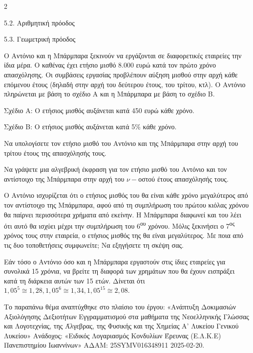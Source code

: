 \begin{ylh}{2}
    \item 5.2. Αριθμητική πρόοδος
    \item 5.3. Γεωμετρική πρόοδος
\end{ylh}
Ο Αντόνιο και η Μπάρμπαρα ξεκινούν να εργάζονται σε διαφορετικές εταιρείες την ίδια μέρα. Ο καθένας έχει ετήσιο μισθό 8.000 ευρώ κατά τον πρώτο χρόνο απασχόλησης. Οι συμβάσεις εργασίας προβλέπουν αύξηση μισθού στην αρχή κάθε επόμενου έτους (δηλαδή στην αρχή του δεύτερου έτους, του τρίτου, κτλ). Ο Αντόνιο πληρώνεται με βάση το σχέδιο Α και η Μπάρμπαρα με βάση το σχέδιο Β.

Σχέδιο Α: Ο ετήσιος μισθός αυξάνεται κατά 450 ευρώ κάθε χρόνο.

Σχέδιο Β: Ο ετήσιος μισθός αυξάνεται κατά 5\% κάθε χρόνο.

\begin{alist}
\item Να υπολογίσετε τον ετήσιο μισθό του Αντόνιο και της Μπάρμπαρα στην αρχή του τρίτου έτους της απασχόλησής τους.
\item Να γράψετε μια αλγεβρική έκφραση για τον ετήσιο μισθό του Αντόνιο και τον αντίστοιχο της Μπάρμπαρα στην αρχή του $\nu -$οστού έτους απασχόλησής τους.
\item Ο Αντόνιο ισχυρίζεται ότι ο ετήσιος μισθός του θα είναι κάθε χρόνο μεγαλύτερος από τον αντίστοιχο της Μπάρμπαρα, αφού από τη συμπλήρωση του πρώτου κιόλας χρόνου θα παίρνει περισσότερα χρήματα από εκείνην. Η Μπάρμπαρα διαφωνεί και του λέει ότι αυτό θα ισχύει μέχρι την συμπλήρωση του 6\textsuperscript{ου} χρόνου. Μόλις ξεκινήσει ο 7\textsuperscript{ος} χρόνος τους στην εταιρεία, ο ετήσιος μισθός της θα είναι μεγαλύτερος. Με ποια από τις δυο τοποθετήσεις συμφωνείτε; Να εξηγήσετε τη σκέψη σας.
\item Εάν τόσο ο Αντόνιο όσο και η Μπάρμπαρα εργαστούν στις ίδιες εταιρείες για συνολικά 15 χρόνια, να βρείτε τη διαφορά των χρημάτων που θα έχουν εισπράξει κατά τη διάρκεια αυτών των 15 ετών.
Δίνεται ότι ${1,05}^{5} \cong 1,28, {1,05}^{6} \cong 1,34, {1,05}^{15} \cong 2,08$.

{\footnotesize Το παραπάνω θέμα αναπτύχθηκε στο πλαίσιο του έργου: «Ανάπτυξη Δοκιμασιών Αξιολόγησης Δεξιοτήτων Εγγραμματισμού στα μαθήματα της Νεοελληνικής Γλώσσας και Λογοτεχνίας, της Άλγεβρας, της Φυσικής και της Χημείας Α' Λυκείου Γενικού Λυκείου» Ανάδοχος: «Ειδικός Λογαριασμός Κονδυλίων Έρευνας (Ε.Λ.Κ.Ε) Πανεπιστημίου Ιωαννίνων» ΑΔΑΜ: 25SYMV016348911 2025-02-20.}
\end{alist}


